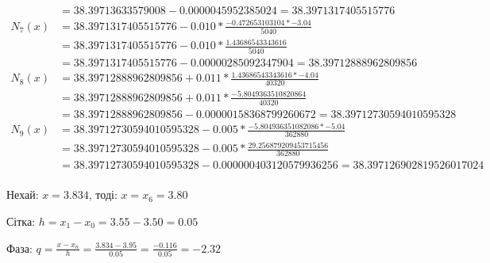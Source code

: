 \begin{align*}
           & = 38.39713633579008 - 0.0000045952385024 = 38.3971317405515776                 \\
    N_7(x) & = 38.3971317405515776 - 0.010 * \frac{-0.472653103104 * -3.04}{5040}           \\
           & = 38.3971317405515776 - 0.010 * \frac{1.43686543343616}{5040}                  \\
           & = 38.3971317405515776 - 0.00000285092347904 = 38.39712888962809856             \\
    N_8(x) & = 38.39712888962809856 + 0.011 * \frac{1.43686543343616 * -4.04}{40320}        \\
           & = 38.39712888962809856 + 0.011 * \frac{-5.8049363510820864}{40320}             \\
           & = 38.39712888962809856 - 0.00000158368799260672 = 38.39712730594010595328      \\
    N_9(x) & = 38.39712730594010595328 - 0.005 * \frac{-5.804936351082086 * -5.04}{362880}  \\
           & = 38.39712730594010595328 - 0.005 * \frac{29.256879209453715456}{362880}       \\
           & = 38.39712730594010595328 - 0.000000403120579936256 = 38.397126902819526017024 \\
\end{align*}

Нехай: $x = 3.834$, тоді: $x = x_6 = 3.80$

Сітка: $h = x_1 - x_0 = 3.55 - 3.50 = 0.05$

Фаза: $q = \frac{x - x_n}{h} = \frac{3.834 - 3.95}{0.05} = \frac{-0.116}{0.05} = -2.32$

